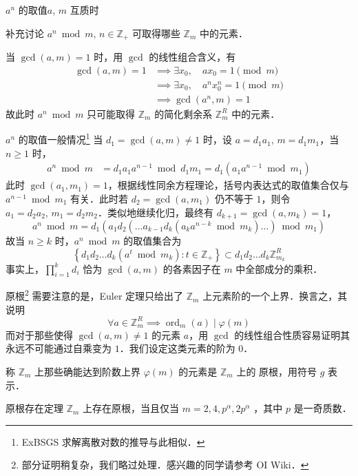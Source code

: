 \documentclass[fontset=fandol]{ctexbeamer}
\newcommand{\myemph}[1]{{\usebeamercolor[fg]{structure} #1}}
\DeclareMathOperator{\ord}{ord}
\begin{document}
\begin{frame}{$a^n$ 的取值}{$a$, $m$ 互质时}

补充讨论 $a^n \bmod m,\, n \in \mathbb Z_{+}$ 可取得哪些 $\mathbb Z_m$ 中的元素．

当 $\gcd(a,m)=1$ 时，用 $\gcd$ 的线性组合含义，有
\[
\begin{aligned}
\gcd(a,m)=1 &\implies \exists x_0,\quad a x_0 = 1 \pmod{m} \\
&\implies \exists x_0,\quad a^n x_0^n = 1 \pmod{m} \\
&\implies \gcd(a^n,m)=1
\end{aligned}
\]
故此时 $a^n \bmod m$ 只可能取得 $\mathbb Z_m$ 的简化剩余系 $\mathbb Z_m^R$ 中的元素．
\end{frame}

\begin{frame}{$a^n$ 的取值}{一般情况\footnote{ExBSGS 求解离散对数\cite{oiwiki-discretelog}的推导与此相似．}}
当 $d_1 = \gcd(a,m) \neq 1$ 时，设 $a = d_1 a_1,\, m = d_1 m_1$，当 $n \geq 1$ 时，
\[
\begin{aligned}
a^n \bmod m &= d_1 a_1 a^{n-1} \bmod d_1 m_1 = d_1 \left( a_1 a^{n-1} \bmod m_1 \right)
\end{aligned}
\]
此时 $\gcd(a_1,m_1)=1$，根据线性同余方程理论，括号内表达式的取值集合仅与 $a^{n-1} \bmod m_1$ 有关．此时若 $d_2 = \gcd(a,m_1)$ 仍不等于 $1$，则令 $a_1 = d_2 a_2,\, m_1 = d_2 m_2$．类似地继续化归，最终有 $d_{k+1} = \gcd(a,m_k) = 1$，
\[
a^n \bmod m = d_1 \left( a_1 d_2 \left( \dots a_{k-1} d_k (a_k a^{n-k} \bmod m_k) \dots \right) \bmod m_1 \right)
\]
故当 $n \geq k$ 时，$a^n \bmod m$ 的取值集合为
\[
\left\{ d_1 d_2 \dots d_k (a^t \bmod m_k) : t \in \mathbb Z_+ \right\} \subset d_1 d_2 \dots d_k \mathbb Z_{m_k}^R
\]
事实上，$\prod_{i=1}^k d_i$ 恰为 $\gcd(a,m)$ 的各素因子在 $m$ 中全部成分的乘积．
\end{frame}

\begin{frame}{原根\footnote{部分证明稍复杂，我们略过处理．感兴趣的同学请参考 OI Wiki\cite{oiwiki-pr}．}}
    需要注意的是，Euler 定理只给出了 $\mathbb Z_m$ 上元素阶的一个上界．换言之，其说明
    \[
    \forall a \in \mathbb Z_m^R \implies \ord_m(a) \mid \varphi(m)
    \]
    而对于那些使得 $\gcd(a,m) \neq 1$ 的元素 $a$，用 $\gcd$ 的线性组合性质容易证明其永远不可能通过自乘变为 $1$．我们设定这类元素的阶为 $0$．

    称 $\mathbb Z_m$ 上那些确能达到阶数上界 $\varphi(m)$ 的元素是 $\mathbb Z_m$ 上的\myemph{原根}，用符号 $g$ 表示．

    \begin{block}{原根存在定理}
        $\mathbb Z_m$ 上存在原根，当且仅当 $m=2,4,p^{\alpha},2p^{\alpha}$ ，其中 $p$ 是一奇质数．
    \end{block}
\end{frame}
\end{document}
